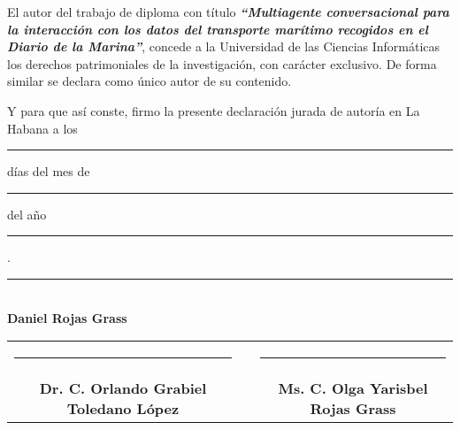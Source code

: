 \authorshipdeclared

\parskip 10pt 
\setlength{\parindent}{0pc}

El autor del trabajo de diploma con título  \textit{\textbf{“Multiagente conversacional para la interacción con los datos del transporte marítimo recogidos en el Diario de la Marina”}}, concede a la Universidad de las Ciencias Informáticas los derechos patrimoniales de la investigación, con carácter exclusivo. De forma similar se declara como único autor de su contenido.

Y para que así conste, firmo la presente declaración jurada de autoría en La Habana a los \rule{8mm}{0.2mm} días del mes de \rule{30mm}{0.2mm} del año \rule{15mm}{0.2mm}.


\vspace{1in}

\begin{center}
	\rule{60mm}{0.3mm} \\
	\textbf{Daniel Rojas Grass}
\end{center}

\vspace{0.5in}

\begin{center}
	\begin{tabular}{cp{0.5in}c}		
		\rule{65mm}{0.3mm}      & & \rule{65mm}{0.3mm}        \\
		\textbf{Dr. C. Orlando Grabiel Toledano López}      & & \textbf{Ms. C. Olga Yarisbel Rojas Grass}
	\end{tabular}
\end{center}

\vspace{0.5in}
